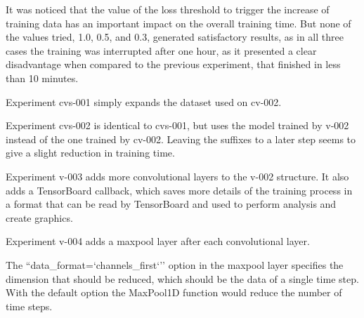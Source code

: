 It was noticed that the value of the loss threshold to trigger the increase of training data has an important impact on the overall training time. But none of the values tried, 1.0, 0.5, and 0.3, generated satisfactory results, as in all three cases the training was interrupted after one hour, as it presented a clear disadvantage when compared to the previous experiment, that finished in less than 10 minutes.

Experiment cvs-001 simply expands the dataset used on cv-002.

Experiment cvs-002 is identical to cvs-001, but uses the model trained by v-002 instead of the one trained by cv-002. Leaving the suffixes  to a later step seems to give a slight reduction in training time.

Experiment v-003 adds more convolutional layers to the v-002 structure.  It also adds a TensorBoard callback, which saves more details of the training process in a format that can be read by TensorBoard and used to perform analysis and create graphics.

Experiment v-004 adds a maxpool layer after each convolutional layer.

The ``data\_format=`channels\_first`'' option in the maxpool layer specifies the dimension that should be reduced, which should be the data of a single time step. With the default option the MaxPool1D function would reduce the number of time steps.

% 


